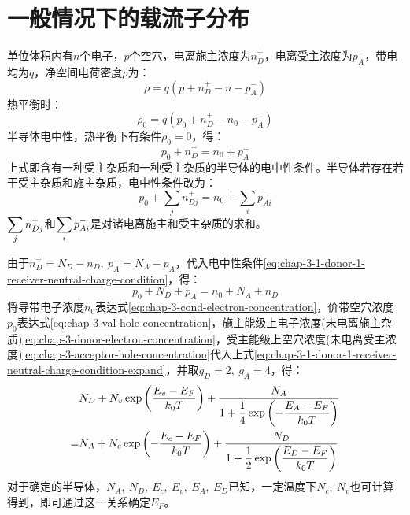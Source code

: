 \section{一般情况下的载流子分布}

单位体积内有$n$个电子，$p$个空穴，电离施主浓度为$n_D^+$，电离受主浓度为$p_A^-$，带电均为$q$，净空间电荷密度$\rho$为：
\begin{equation}
    \rho=q\left(p+n_D^+-n-p_A^-\right)
\end{equation}
热平衡时：
\begin{equation}
    \rho_0=q\left(p_0+n_D^+-n_0-p_A^-\right)
\end{equation}
半导体电中性，热平衡下有条件$\rho_0=0$，得：
\begin{equation}
    p_0+n_D^+=n_0+p_A^-\label{eq:chap-3-1-donor-1-receiver-neutral-charge-condition}
\end{equation}
上式即含有一种受主杂质和一种受主杂质的半导体的电中性条件。半导体若存在若干受主杂质和施主杂质，电中性条件改为：
\begin{equation}
    p_0+\sum_{j}n_{Dj}^+=n_0+\sum_{i}p_{Ai}^-
\end{equation}
\vspace{1ex}$\displaystyle \sum_{j}n_{Dj}^+$和$\displaystyle \sum_{i}p_{Ai}^-$是对诸电离施主和受主杂质的求和。

由于$n_D^+=N_D-n_D,\ p_A^-=N_A-p_A$，代入电中性条件\autoref{eq:chap-3-1-donor-1-receiver-neutral-charge-condition}，得：
\begin{equation}
    p_0+N_D+p_A=n_0+N_A+n_D\label{eq:chap-3-1-donor-1-receiver-neutral-charge-condition-expand}
\end{equation}
将导带电子浓度$n_0$表达式\autoref{eq:chap-3-cond-electron-concentration}，价带空穴浓度$p_0$表达式\autoref{eq:chap-3-val-hole-concentration}，施主能级上电子浓度(未电离施主杂质)\autoref{eq:chap-3-donor-electron-concentration}，受主能级上空穴浓度(未电离受主浓度)\autoref{eq:chap-3-acceptor-hole-concentration}代入上式\autoref{eq:chap-3-1-donor-1-receiver-neutral-charge-condition-expand}，并取$g_D=2,\ g_A=4$，得：
\begin{equation}
\begin{aligned}
    &N_D+N_v\exp{\left(\frac{E_v-E_F}{k_0T}\right)}+\frac{N_A}{\displaystyle 1+\frac{1}{4}\exp{\left(-\frac{E_A-E_F}{k_0T}\right)}}\\
    =&N_A+N_c\exp{\left(-\frac{E_c-E_F}{k_0T}\right)}+\frac{N_D}{\displaystyle 1+\frac{1}{2}\exp{\left(\frac{E_D-E_F}{k_0T}\right)}}
\end{aligned}
\end{equation}
对于确定的半导体，$N_A,\ N_D,\ E_c,\ E_v,\ E_A,\ E_D$已知，一定温度下$N_c,\ N_v$也可计算得到，即可通过这一关系确定$E_F$。

